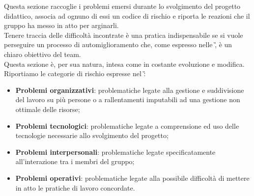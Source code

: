 Questa sezione raccoglie i problemi emersi durante lo svolgimento del progetto didattico, associa 
ad ognuno di essi un codice di rischio e riporta le reazioni che il gruppo ha messo in atto 
per arginarli. \\
Tenere traccia delle difficoltà incontrate è una pratica indispensabile se si 
vuole perseguire un processo di automiglioramento che, come espresso nelle \NdP\G, è un 
chiaro obiettivo del team. \\
Questa sezione è, per sua natura, intesa come in costante evoluzione e modifica.\\
Riportiamo le categorie di rischio espresse nel \PdP\G: 


\begin{itemize}
	\item \textbf{Problemi organizzativi}: problematiche legate alla gestione e suddivisione del lavoro su più persone o a rallentamenti imputabili ad una gestione non ottimale delle risorse;
   \item \textbf{Problemi tecnologici}: problematiche legate a comprensione ed uso delle tecnologie necessarie allo svolgimento del progetto;
   \item \textbf{Problemi interpersonali}: problematiche legate specificatamente all'interazione tra i membri del gruppo;
   \item \textbf{Problemi operativi}: problematiche legate alla possibile difficoltà di mettere in atto le pratiche di lavoro concordate.
 
\end{itemize}


